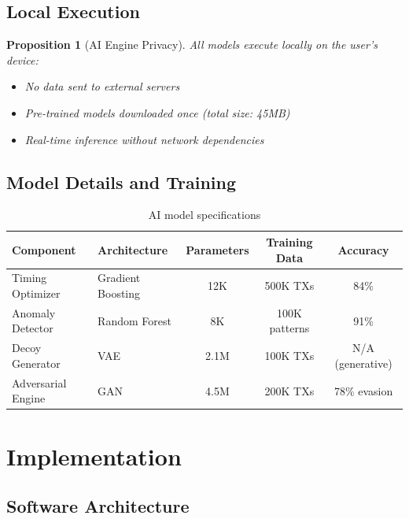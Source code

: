 \documentclass[11pt]{article}
\theoremstyle{definition}
\theoremstyle{plain}
\newtheorem{proposition}{Proposition}[section]
\theoremstyle{remark}
\begin{document}
\subsection{Local Execution}

\begin{proposition}[AI Engine Privacy]
All models execute locally on the user's device:
\begin{itemize}
    \item No data sent to external servers
    \item Pre-trained models downloaded once (total size: 45MB)
    \item Real-time inference without network dependencies
\end{itemize}
\end{proposition}

\subsection{Model Details and Training}

\begin{table}[H]
\centering
\caption{AI model specifications}
\label{tab:ai_models}
\begin{tabular}{llccc}
\toprule
\textbf{Component} & \textbf{Architecture} & \textbf{Parameters} & \textbf{Training Data} & \textbf{Accuracy} \\
\midrule
Timing Optimizer & Gradient Boosting & 12K & 500K TXs & 84\% \\
Anomaly Detector & Random Forest & 8K & 100K patterns & 91\% \\
Decoy Generator & VAE & 2.1M & 100K TXs & N/A (generative) \\
Adversarial Engine & GAN & 4.5M & 200K TXs & 78\% evasion \\
\bottomrule
\end{tabular}
\end{table}

\section{Implementation}
\label{sec:implementation}

\subsection{Software Architecture}
\end{document}
